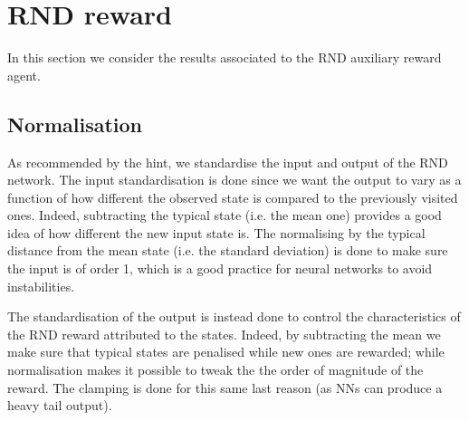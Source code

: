 \documentclass[a4paper, 12pt,oneside]{article}
\begin{document}
        \section{RND reward}
        In this section we consider the results associated to the RND auxiliary reward agent.
            \subsection{Normalisation} 
            As recommended by the hint, we standardise the input and output of the RND network. The input standardisation is done since we want the output to vary as a function of how different the observed state is compared to the previously visited ones. Indeed, subtracting the typical state (i.e. the mean one) provides a good idea of how different the new input state is. The normalising by the typical distance from the mean state (i.e. the standard deviation) is done to make sure the input is of order 1, which is a good practice for neural networks to avoid instabilities.
            
            The standardisation of the output is instead done to control the characteristics of the RND reward attributed to the states. Indeed, by subtracting the mean we make sure that typical states are penalised  while new ones are rewarded; while normalisation makes it possible to tweak the the order of magnitude of the reward. The clamping is done for this same last reason (as NNs can produce a heavy tail output). 
\end{document}
